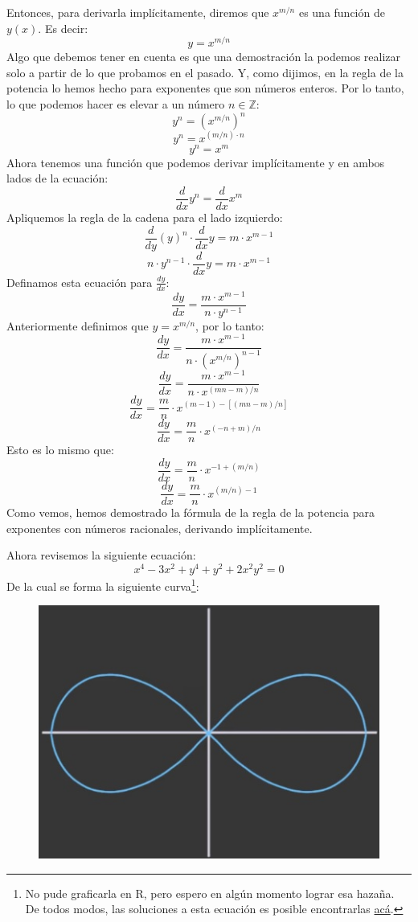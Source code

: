 \documentclass[12pt]{article}
\begin{document}
Entonces, para derivarla implícitamente, diremos que $x^{m/n}$ es una función de $y(x)$. Es decir:
\[y = x^{m/n}\]
Algo que debemos tener en cuenta es que una demostración la podemos realizar solo a partir de lo que probamos en el pasado. Y, como dijimos, en la regla de la potencia lo hemos hecho para exponentes que son números enteros. Por lo tanto, lo que podemos hacer es elevar a un número $n \in \mathbb{Z}$:
\[y^{n} = (x^{m/n})^{n}\]
\[y^{n} = x^{(m/n) \cdot n}\]
\[y^{n} = x^{m}\]
Ahora tenemos una función que podemos derivar implícitamente y en ambos lados de la ecuación:
\[\frac{d}{dx} y^{n} = \frac{d}{dx} x^{m}\]
Apliquemos la regla de la cadena para el lado izquierdo:
\[\frac{d}{dy} (y)^{n} \cdot \frac{d}{dx} y = m \cdot x^{m-1}\]
\[n \cdot y^{n-1} \cdot \frac{d}{dx} y = m \cdot x^{m-1}\]
Definamos esta ecuación para $\frac{dy}{dx}$:
\[\frac{dy}{dx} = \frac{m \cdot x^{m-1}}{n \cdot y^{n-1}}\]
Anteriormente definimos que $y = x^{m/n}$, por lo tanto:
\[\frac{dy}{dx} = \frac{m \cdot x^{m-1}}{n \cdot (x^{m/n})^{n-1}}\]
\[\frac{dy}{dx} = \frac{m \cdot x^{m-1}}{n \cdot x^{(mn-m)/n}}\]
\[\frac{dy}{dx} = \frac{m}{n} \cdot x^{(m-1) - [(mn-m)/n]}\]
\[\frac{dy}{dx} = \frac{m}{n} \cdot x^{(-n + m)/n}\]
Esto es lo mismo que:
\[\frac{dy}{dx} = \frac{m}{n} \cdot x^{-1 + (m/n)}\]
\[\frac{dy}{dx} = \frac{m}{n} \cdot x^{(m/n) - 1}\]
Como vemos, hemos demostrado la fórmula de la regla de la potencia para exponentes con números racionales, derivando implícitamente.

Ahora revisemos la siguiente ecuación:
\[x^{4} - 3x^{2} + y^{4} + y^{2} + 2x^{2}y^{2} = 0\]
De la cual se forma la siguiente curva\footnote{No pude graficarla en R, pero espero en algún momento lograr esa hazaña. De todos modos, las soluciones a esta ecuación es posible encontrarlas \href{https://es.symbolab.com/solver/functions-calculator/simplificar\%20x\%5E\%7B4\%7D-\%203x\%5E\%7B2\%7D\%2B\%20y\%5E\%7B4\%7D\%2B\%20y\%5E\%7B2\%7D\%2B2x\%5E\%7B2\%7Dy\%5E\%7B2\%7D\%3D\%200}{acá}.}:

\begin{figure}[hbt!]
\centering
\includegraphics[scale=0.7]{img/implicit_diff_6.jpg}
\end{figure}
\end{document}
